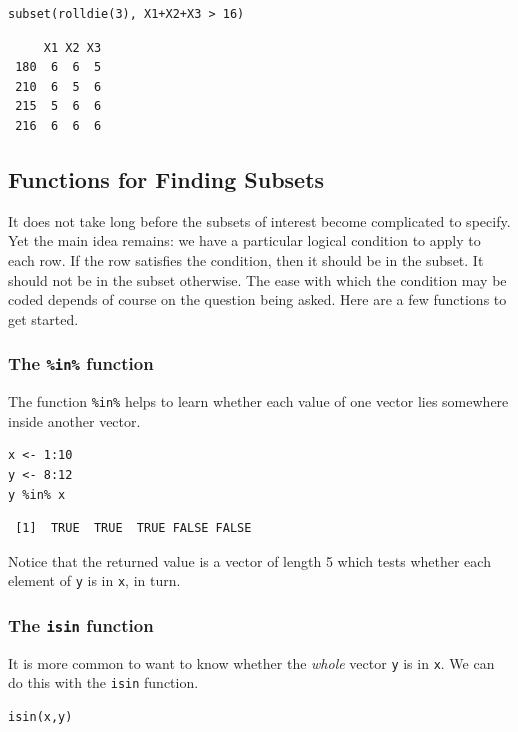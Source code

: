 \documentclass[captions=tableheading]{scrbook}
\begin{document}
\lstset{language=R}
\begin{lstlisting}
subset(rolldie(3), X1+X2+X3 > 16)
\end{lstlisting}

\begin{verbatim}
     X1 X2 X3
 180  6  6  5
 210  6  5  6
 215  5  6  6
 216  6  6  6
\end{verbatim}
\subsection{Functions for Finding Subsets}
\label{sec-4-2-2}


It does not take long before the subsets of interest become complicated to specify. Yet the main idea remains: we have a particular logical condition to apply to each row. If the row satisfies the condition, then it should be in the subset. It should not be in the subset otherwise. The ease with which the condition may be coded depends of course on the question being asked. Here are a few functions to get started.
\subsubsection{The \texttt{\%in\%} function}
\label{sec-4-2-2-1}


The function \texttt{\%in\%} helps to learn whether each value of one vector lies somewhere inside another vector. 


\lstset{language=R}
\begin{lstlisting}
x <- 1:10 
y <- 8:12 
y %in% x
\end{lstlisting}

\begin{verbatim}
 [1]  TRUE  TRUE  TRUE FALSE FALSE
\end{verbatim}

Notice that the returned value is a vector of length 5 which tests whether each element of \texttt{y} is in \texttt{x}, in turn.
\subsubsection{The \texttt{isin} function}
\label{sec-4-2-2-2}


It is more common to want to know whether the \emph{whole} vector \texttt{y} is in \texttt{x}. We can do this with the \texttt{isin} function. 


\lstset{language=R}
\begin{lstlisting}
isin(x,y)
\end{lstlisting}
\end{document}
